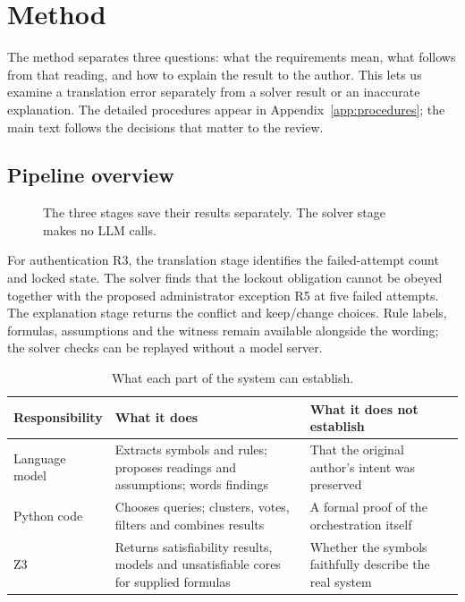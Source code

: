 \section{Method}\label{sec:design}

The method separates three questions: what the requirements mean, what follows from that reading, and how to explain the result to the author. This lets us examine a translation error separately from a solver result or an inaccurate explanation. The detailed procedures appear in Appendix~\ref{app:procedures}; the main text follows the decisions that matter to the review.

\subsection{Pipeline overview}

\begin{figure}[H]
\centering
\resizebox{\linewidth}{!}{}
\caption{The three stages save their results separately. The solver stage makes no LLM calls.}\label{fig:pipeline}
\end{figure}

For authentication R3, the translation stage identifies the failed-attempt count and locked state. The solver finds that the lockout obligation cannot be obeyed together with the proposed administrator exception R5 at five failed attempts. The explanation stage returns the conflict and keep/change choices. Rule labels, formulas, assumptions and the witness remain available alongside the wording; the solver checks can be replayed without a model server.

\begin{table}[H]
\centering
\begin{tabularx}{\linewidth}{@{}lXX@{}}
\toprule
Responsibility & What it does & What it does not establish \\
\midrule
Language model & Extracts symbols and rules; proposes readings and assumptions; words findings & That the original author's intent was preserved \\
Python code & Chooses queries; clusters, votes, filters and combines results & A formal proof of the orchestration itself \\
Z3 & Returns satisfiability results, models and unsatisfiable cores for supplied formulas & Whether the symbols faithfully describe the real system \\
\bottomrule
\end{tabularx}
\caption{What each part of the system can establish.}
\end{table}

